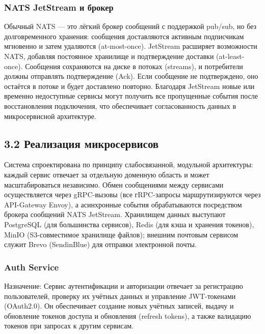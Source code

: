 \subsubsection*{NATS JetStream и брокер}

Обычный NATS — это лёгкий брокер сообщений с поддержкой pub/sub, но без долговременного хранения: сообщения доставляются активным подписчикам мгновенно и затем удаляются (at-most-once). JetStream расширяет возможности NATS, добавляя постоянное хранилище и подтверждение доставки (at-least-once). Сообщения сохраняются на диске в потоках (streams), и потребители должны отправлять подтверждение (Ack). Если сообщение не подтверждено, оно остаётся в потоке и будет доставлено повторно. Благодаря JetStream новые или временно недоступные сервисы могут получить все пропущенные события после восстановления подключения, что обеспечивает согласованность данных в микросервисной архитектуре.

\subsection*{3.2 Реализация микросервисов}

Система спроектирована по принципу слабосвязанной, модульной архитектуры: каждый сервис отвечает за отдельную доменную область и может масштабироваться независимо. Обмен сообщениями между сервисами осуществляется через gRPC-вызовы (все гRPC-запросы маршрутизируются через API-Gateway Envoy), а асинхронные события обрабатываются посредством брокера сообщений NATS JetStream. Хранилищем данных выступают PostgreSQL (для большинства сервисов), Redis (для кэша и хранения токенов), MinIO (S3-совместимое хранилище файлов); внешним почтовым сервисом служит Brevo (SendinBlue) для отправки электронной почты.

\subsubsection*{Auth Service}
Назначение: Сервис аутентификации и авторизации отвечает за регистрацию пользователей, проверку их учётных данных и управление JWT-токенами (OAuth2.0). Он обеспечивает создание новых учётных записей, выдачу и обновление токенов доступа и обновления (refresh tokens), а также валидацию токенов при запросах к другим сервисам.

